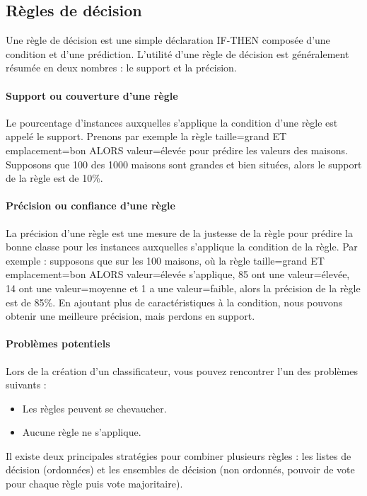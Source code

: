 \subsection{Règles de décision}

Une règle de décision est une simple déclaration IF-THEN composée d'une condition et d'une prédiction. L'utilité d'une règle de décision est généralement résumée en deux nombres : le support et la précision.

\paragraph{Support ou couverture d'une règle}
Le pourcentage d'instances auxquelles s'applique la condition d'une règle est appelé le support. Prenons par exemple la règle taille=grand ET emplacement=bon ALORS valeur=élevée pour prédire les valeurs des maisons. Supposons que 100 des 1000 maisons sont grandes et bien situées, alors le support de la règle est de 10\%.

\paragraph{Précision ou confiance d'une règle}
La précision d'une règle est une mesure de la justesse de la règle pour prédire la bonne classe pour les instances auxquelles s'applique la condition de la règle. Par exemple : supposons que sur les 100 maisons, où la règle taille=grand ET emplacement=bon ALORS valeur=élevée s'applique, 85 ont une valeur=élevée, 14 ont une valeur=moyenne et 1 a une valeur=faible, alors la précision de la règle est de 85\%. En ajoutant plus de caractéristiques à la condition, nous pouvons obtenir une meilleure précision, mais perdons en support.

\paragraph{Problèmes potentiels}
Lors de la création d'un classificateur, vous pouvez rencontrer l'un des problèmes suivants :
\begin{itemize}
    \item Les règles peuvent se chevaucher.
    \item Aucune règle ne s'applique.
\end{itemize}
Il existe deux principales stratégies pour combiner plusieurs règles : les listes de décision (ordonnées) et les ensembles de décision (non ordonnés, pouvoir de vote pour chaque règle puis vote majoritaire).

